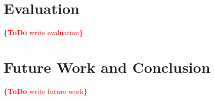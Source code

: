 \documentclass[runningheads,a4paper]{llncs}
\newcommand{\todo}[1]{\noindent\textcolor{red}{{\bf \{ToDo }#1{\bf \}}}}
\begin{document}
\section{Evaluation}
\todo{write evaluation}

\section{Future Work and Conclusion} \label{sec:future-work-conclusion}
\todo{write future work}

\renewcommand{\ttdefault}{cmvtt}
\renewcommand\UrlFont\tt



\end{document}
